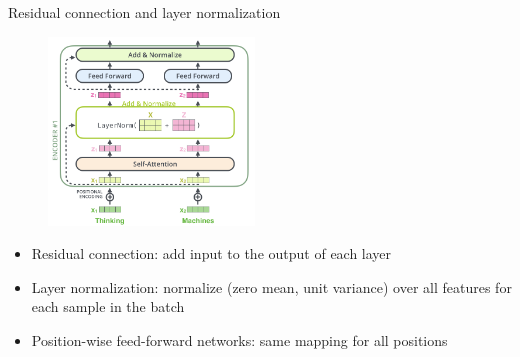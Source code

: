 \documentclass[usenames,dvipsnames,notes,11pt,aspectratio=169,hyperref={colorlinks=true, linkcolor=blue}]{beamer}
\begin{document}
\begin{frame}
    {Residual connection and layer normalization}
    \begin{figure}
        \includegraphics[height=5cm]{figures/add-norm}
    \end{figure}
    \vspace{-2em}
    \begin{itemize}
        \item Residual connection: add input to the output of each layer 
        \item Layer normalization: normalize (zero mean, unit variance) over all features for each sample in the batch
        \item Position-wise feed-forward networks: same mapping for all positions
    \end{itemize}
\end{frame}
\end{document}
